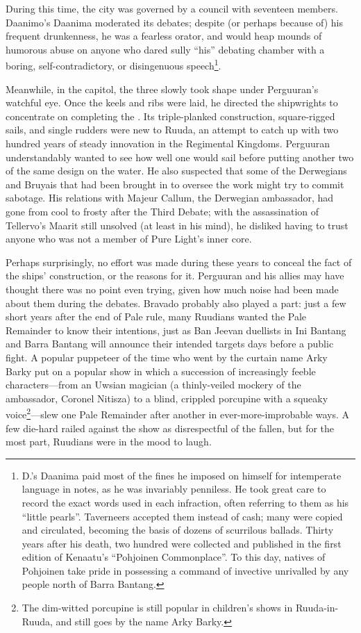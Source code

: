 \documentclass[12pt]{report}
\begin{document}
During this time, the city was governed by a council with seventeen
members.  Daanimo's Daanima moderated its debates; despite (or perhaps
because of) his frequent drunkenness, he was a fearless orator, and
would heap mounds of humorous abuse on anyone who dared sully ``his''
debating chamber with a boring, self-contradictory, or disingenuous
speech\footnote{D.'s Daanima paid most of the fines he imposed on
himself for intemperate language in notes, as he was invariably
penniless.  He took great care to record the exact words used in each
infraction, often referring to them as his ``little pearls''.
Taverneers accepted them instead of cash; many were copied and
circulated, becoming the basis of dozens of scurrilous ballads.
Thirty years after his death, two hundred were collected and published
in the first edition of Kenaatu's ``Pohjoinen Commonplace''.  To this
day, natives of Pohjoinen take pride in possessing a command of
invective unrivalled by any people north of Barra Bantang.}.

Meanwhile, in the capitol, the three  slowly took
shape under Perguuran's watchful eye.  Once the keels and ribs were
laid, he directed the shipwrights to concentrate on completing the
.  Its triple-planked construction,
square-rigged sails, and single rudders were new to Ruuda, an attempt
to catch up with two hundred years of steady innovation in the
Regimental Kingdoms.  Perguuran understandably wanted to see how well
one would sail before putting another two of the same design on the
water.  He also suspected that some of the Derwegians and Bruyais that
had been brought in to oversee the work might try to commit sabotage.
His relations with Majeur Callum, the Derwegian ambassador, had gone
from cool to frosty after the Third Debate; with the assassination of
Tellervo's Maarit still unsolved (at least in his mind), he disliked
having to trust anyone who was not a member of Pure Light's inner
core.

Perhaps surprisingly, no effort was made during these years to conceal
the fact of the ships' construction, or the reasons for it.  Perguuran
and his allies may have thought there was no point even trying, given
how much noise had been made about them during the debates.  Bravado
probably also played a part: just a few short years after the end of
Pale rule, many Ruudians wanted the Pale Remainder to know their
intentions, just as Ban Jeevan duellists in Ini Bantang and Barra
Bantang will announce their intended targets days before a public
fight.  A popular puppeteer of the time who went by the curtain name
Arky Barky put on a popular show in which a succession of increasingly
feeble characters---from an Uwsian magician (a thinly-veiled mockery
of the ambassador, Coronel Nitisza) to a blind, crippled porcupine
with a squeaky voice\footnote{The dim-witted porcupine is still
popular in children's shows in Ruuda-in-Ruuda, and still goes by the
name Arky Barky.}---slew one Pale Remainder after another in
ever-more-improbable ways.  A few die-hard {\aemott} railed against
the show as disrespectful of the fallen, but for the most part,
Ruudians were in the mood to laugh.
\end{document}
